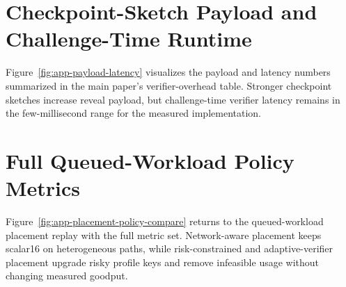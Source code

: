 \documentclass[sigplan,screen,review,anonymous]{acmart}
\begin{document}
\section{Checkpoint-Sketch Payload and Challenge-Time Runtime}
\label{app:payload-latency}

Figure~\ref{fig:app-payload-latency} visualizes the payload and latency
numbers summarized in the main paper's verifier-overhead table. Stronger
checkpoint sketches increase reveal payload, but challenge-time verifier
latency remains in the few-millisecond range for the measured implementation.


\section{Full Queued-Workload Policy Metrics}
\label{app:placement-composition}

Figure~\ref{fig:app-placement-policy-compare} returns to the queued-workload
placement replay with the full metric set. Network-aware placement keeps
scalar16 on heterogeneous paths, while risk-constrained and adaptive-verifier
placement upgrade risky profile keys and remove infeasible usage without
changing measured goodput.
\end{document}
